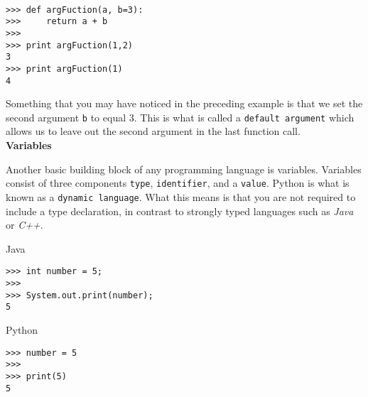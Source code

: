 \documentclass[letterpaper,11pt]{article}
\begin{document}
\\
\begin{minipage}{.5\textwidth}
    \begin{tcolorbox}
        \begin{footnotesize}
            \begin{verbatim}
>>> def argFuction(a, b=3):
>>>     return a + b   
>>>
>>> print argFuction(1,2)
3
>>> print argFuction(1)
4
            \end{verbatim}
        \end{footnotesize}
    \end{tcolorbox}
\end{minipage}
\par{Something that you may have noticed in the preceding example is that we set
the second argument \texttt{b} to equal 3. This is what is called a
\texttt{default argument} which allows us to leave out the second argument in
the last function call.}
\\
\textbf{Variables}
\par{Another basic building block of any programming language is variables.
    Variables consist of three components \texttt{type}, \texttt{identifier},
    and a \texttt{value}. Python is what is known as a \texttt{dynamic
    language}. What this means is that you are not required to include a type
declaration, in contrast to strongly typed languages such as \textit{Java} or
\textit{C++}.}
\\ 
%
\begin{minipage}{.5\textwidth}
    Java
    \begin{tcolorbox}
        \begin{footnotesize}
            \begin{verbatim}
>>> int number = 5;
>>>
>>> System.out.print(number);
5
            \end{verbatim}
        \end{footnotesize}
    \end{tcolorbox}
\end{minipage}
%
\begin{minipage}{.5\textwidth}
    Python
    \begin{tcolorbox}
        \begin{footnotesize}
            \begin{verbatim}
>>> number = 5
>>>
>>> print(5)
5
            \end{verbatim}
        \end{footnotesize}
    \end{tcolorbox}
\end{minipage}
\end{document}
